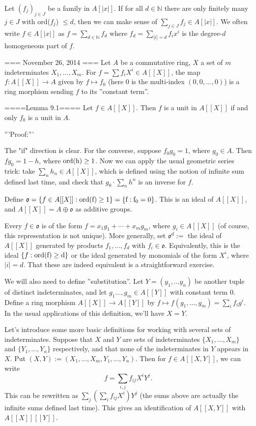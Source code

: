 Let $(f_j)_{j \in J}$ be a family in $A[|x|]$. If for all $d \in \mathbb{N}$ there are only finitely many $j \in J$ with ord($f_j$) $\leq d$, then we can make sense of $\sum_{j \in J}f_j \in A[|x|]$. We often write $f \in A[|x|]$ as $f=\sum_{d \in \mathbb{N}} f_d$ where $f_d=\sum_{|i|=d}f_i x^i$ is the degree-$d$ homogeneous part of $f$.

=== November 26, 2014 ===
Let $A$ be a commutative ring, $X$ a set of $m$ indeterminates $X_1,\ldots,X_m$. For $f=\sum f_i X^i \in A[[X]]$, the map $f: A[[X]]\rightarrow A$ given by $f\mapsto f_0$ (here $0$ is the multi-index $(0,0,\ldots,0)$) is a ring morphism sending $f$ to its ''constant term''. 

====Lemma 9.1====
Let $f\in A[[X]]$. Then $f$ is a unit in $A[[X]]$ if and only $f_0$ is a unit in $A$.

'''Proof:'''

The "if" direction is clear. For the converse, suppose $f_0g_0=1$, where $g_0\in A$. Then $fg_0=1-h$, where $\rm{ord}(h)\ge 1$. Now we can apply the usual geometric series trick: take $\sum_n h_n\in A[[X]]$, which is defined using the notion of infinite sum defined last time, and check that $g_0\cdot \sum_n h^n$ is an inverse for $f$. 


Define $\mathfrak{o}=\{f\in A[[X]]:\rm{ord}(f)\ge 1\}=\{f:f_0=0\}$. This is an ideal of $A[[X]]$, and $A[[X]]=A\oplus \mathfrak{o}$ as additive groups. 

Every $f\in \mathfrak{o}$ is of the form $f=x_1g_1+\cdots +x_mg_m$, where $g_i\in A[[X]]$ (of course, this representation is not unique). More generally, set $\mathfrak{o}^d:=$ the ideal of $A[[X]]$ generated by products $f_1,\ldots,f_d$ with $f_i\in \mathfrak{o}$. Equivalently, this is the ideal $\{f:\rm{ord}(f)\ge d\}$ or the ideal generated by monomials of the form $X^i$, where $|i|=d$. That these are indeed equivalent is a straightforward exercise.

We will also need to define ''substitution''. Let $Y=(y_1,\ldots y_n)$ be another tuple of distinct indeterminates, and let $g_1\ldots, g_m\in A[[Y]]$ with constant term $0$. Define a ring morphism $A[[X]]\rightarrow A[[Y]]$ by $f\mapsto f(g_1,\ldots, g_m)=\sum_i f_i g^i$. In the usual applications of this definition, we'll have $X=Y$.

Let's introduce some more basic definitions for working with several sets of indeterminates. Suppose that $X$ and $Y$ are sets of indeterminates $\{X_1,\ldots,X_m\}$ and $\{Y_1,\ldots,Y_n\}$ respectively, and that none of the indeterminates in $Y$ appears in $X$. Put $(X,Y):=(X_1,\ldots, X_m, Y_1,\ldots, Y_n)$. Then for $f\in A[[X,Y]]$, we can write 
$$f= \sum_{i,j} f_{ij} X^iY^j.$$
This can be rewritten as $\sum_j(\sum_i f_{ij}X^i)Y^j$ (the sums above are actually the infinite sums defined last time). This gives an identification of $A[[X,Y]]$ with $A[[X]][[Y]]$.

